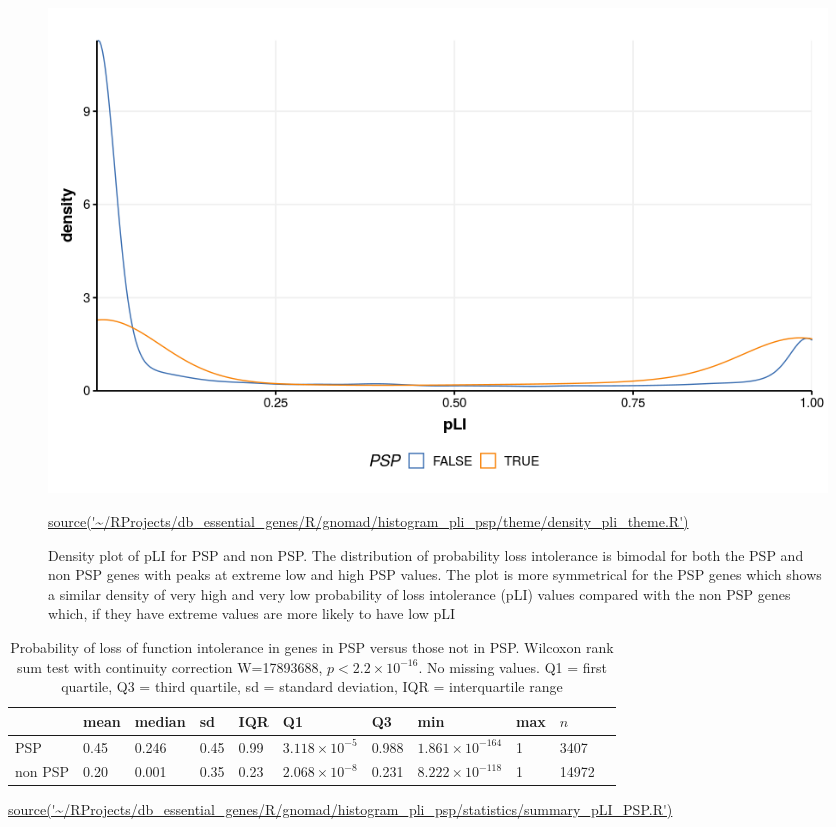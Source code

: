 \begin{figure}
    \centering
    \includegraphics[width=\textwidth]{images/chapter3/ggplot2/gnomad/theme/Rplot_density_Mar_gnomad_theme.png}
    \caption[Density plot pLI for PSP and non PSP genes]{Density plot of pLI for PSP and non PSP. The distribution of probability loss intolerance is bimodal for both the PSP and non PSP genes with peaks at extreme low and high PSP values. The plot is more symmetrical for the PSP genes which shows a similar density of very high and very low probability of loss intolerance (pLI) values compared with the non PSP genes which, if they have extreme values are more likely to have low pLI}
    \tiny\url{source('~/RProjects/db_essential_genes/R/gnomad/histogram_pli_psp/theme/density_pli_theme.R')}
    
    \label{fig:densityPLI_theme}
\end{figure}






\begin{table}[ht]
\centering
\setlength{\extrarowheight}{2pt}
\begin{adjustbox}{width=\textwidth}
\begin{tabular}{lllllllllll}
  \toprule
 & mean & median & sd & IQR & Q1 & Q3 & min & max & $n$ \\ 
  \midrule
PSP & 0.45 & 0.246 & 0.45 & 0.99 & $3.118 \times 10^{-5}$ & 0.988 & $1.861 \times 10^{-164}$ & 1 & 3407  \\ 
  non PSP & 0.20 & 0.001 & 0.35 & 0.23 & $2.068 \times 10^{-8}$ & 0.231 & $8.222 \times 10^{-118}$ & 1 & 14972 \\ 
   \bottomrule
\end{tabular}
\end{adjustbox}
\caption[Summary statistics PSP versus non PSP genes pLI]{Probability of loss of function intolerance in genes in PSP versus those not in PSP. Wilcoxon rank sum test with continuity correction W=17893688, $p<2.2\times10^{-16}$. No missing values. Q1 = first quartile, Q3 = third quartile, sd = standard deviation, IQR = interquartile range} 
\tiny\url{source('~/RProjects/db_essential_genes/R/gnomad/histogram_pli_psp/statistics/summary_pLI_PSP.R')}
\label{tab:Probability of loss of function intolerance in genes in PSP versus those not in PSP}
\end{table}




